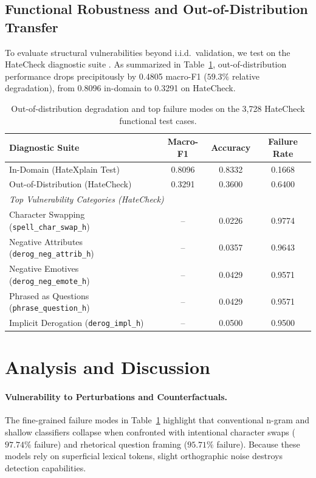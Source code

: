 \documentclass[11pt]{article}
\begin{document}
\subsection{Functional Robustness and Out-of-Distribution Transfer}
To evaluate structural vulnerabilities beyond i.i.d.\ validation, we test on the HateCheck diagnostic suite \citep{vidgen2021hatecheck}. As summarized in Table~\ref{tab:ood}, out-of-distribution performance drops precipitously by 0.4805 macro-F1 ($59.3\%$ relative degradation), from 0.8096 in-domain to 0.3291 on HateCheck.

\begin{table}[t]
\centering
\small
\begin{tabular}{lccc}
\toprule
Diagnostic Suite & Macro-F1 & Accuracy & Failure Rate \\
\midrule
In-Domain (HateXplain Test) & 0.8096 & 0.8332 & 0.1668 \\
Out-of-Distribution (HateCheck) & 0.3291 & 0.3600 & 0.6400 \\
\midrule
\multicolumn{4}{l}{\textit{Top Vulnerability Categories (HateCheck)}} \\
\quad Character Swapping (\texttt{spell\_char\_swap\_h}) & -- & 0.0226 & 0.9774 \\
\quad Negative Attributes (\texttt{derog\_neg\_attrib\_h}) & -- & 0.0357 & 0.9643 \\
\quad Negative Emotives (\texttt{derog\_neg\_emote\_h}) & -- & 0.0429 & 0.9571 \\
\quad Phrased as Questions (\texttt{phrase\_question\_h}) & -- & 0.0429 & 0.9571 \\
\quad Implicit Derogation (\texttt{derog\_impl\_h}) & -- & 0.0500 & 0.9500 \\
\bottomrule
\end{tabular}
\caption{Out-of-distribution degradation and top failure modes on the 3,728 HateCheck functional test cases.}
\label{tab:ood}
\end{table}

\section{Analysis and Discussion}
\label{sec:analysis}

\paragraph{Vulnerability to Perturbations and Counterfactuals.} 
The fine-grained failure modes in Table~\ref{tab:ood} highlight that conventional n-gram and shallow classifiers collapse when confronted with intentional character swaps ($97.74\%$ failure) and rhetorical question framing ($95.71\%$ failure). Because these models rely on superficial lexical tokens, slight orthographic noise destroys detection capabilities.
\end{document}
